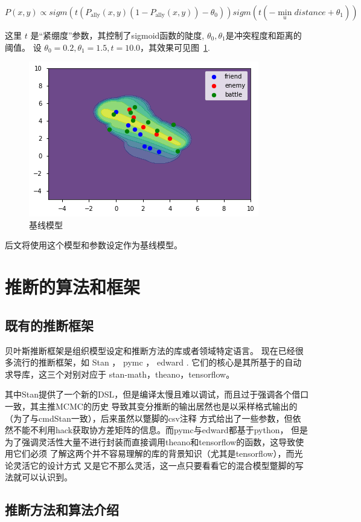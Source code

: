 \documentclass{sicnuthesis}
\begin{document}
$$
P(x,y) \propto sigm(t (P_\text{ally}(x,y) (1-P_\text{ally}(x,y)) - \theta_0)) sigm(t(-\min_{u} distance + \theta_1))
$$


这里 $t$ 是“紧绷度”参数，其控制了sigmoid函数的陡度, $\theta_0,\theta_1$是冲突程度和距离的阈值。
 设 $\theta_0=0.2,\theta_1=1.5,t = 10.0$，其效果可见图~\ref{fig:combSix}.


\begin{figure}[htb]
\includegraphics[width=0.6\linewidth]{comb6.png}
\caption{基线模型}
\label{fig:combSix}
\end{figure}


后文将使用这个模型和参数设定作为基线模型。

\section{推断的算法和框架}


\subsection{既有的推断框架}

贝叶斯推断框架是组织模型设定和推断方法的库或者领域特定语言。
现在已经很多流行的推断框架，如 Stan \cite{carpenter2017stan}，
pymc\cite{patil2010pymc} ， edward \cite{tran2016edward}. 
它们的核心是其所基于的自动求导库，这三个对别对应于 stan-math，theano，tensorflow。

其中Stan提供了一个新的DSL，但是编译太慢且难以调试，而且过于强调各个借口一致，其主推MCMC的历史
导致其变分推断的输出居然也是以采样格式输出的（为了与cmdStan一致），后来虽然以蹩脚的csv注释
方式给出了一些参数，但依然不能不利用hack获取协方差矩阵的信息。而pymc与edward都基于python，
但是为了强调灵活性大量不进行封装而直接调用theano和tensorflow的函数，这导致使用它们必须
了解这两个并不容易理解的库的背景知识（尤其是tensorflow），而光论灵活它的设计方式
又是它不那么灵活，这一点只要看看它的混合模型蹩脚的写法就可以认识到。

\subsection{推断方法和算法介绍}
\end{document}
